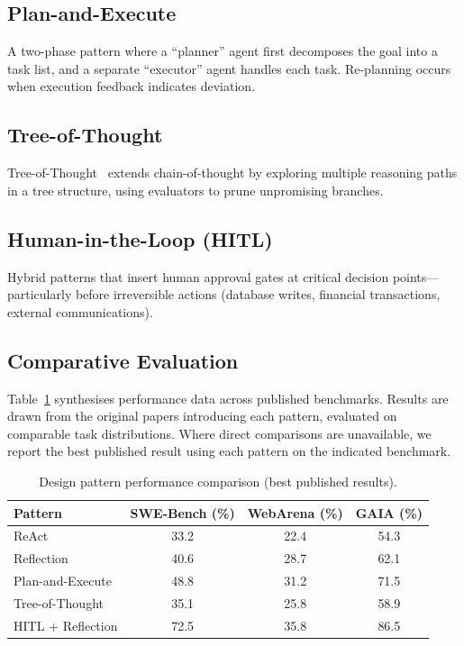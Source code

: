 \documentclass[12pt, a4paper]{article}
\begin{document}
\subsection{Plan-and-Execute}
A two-phase pattern where a ``planner'' agent first decomposes the goal into a task list, and a separate ``executor'' agent handles each task. Re-planning occurs when execution feedback indicates deviation.

\subsection{Tree-of-Thought}
Tree-of-Thought~\citep{yao2024tree} extends chain-of-thought by exploring multiple reasoning paths in a tree structure, using evaluators to prune unpromising branches.

\subsection{Human-in-the-Loop (HITL)}
Hybrid patterns that insert human approval gates at critical decision points---particularly before irreversible actions (database writes, financial transactions, external communications).

\subsection{Comparative Evaluation}
Table~\ref{tab:patterns} synthesises performance data across published benchmarks. Results are drawn from the original papers introducing each pattern, evaluated on comparable task distributions. Where direct comparisons are unavailable, we report the best published result using each pattern on the indicated benchmark.

\begin{table}[ht]
\centering
\caption{Design pattern performance comparison (best published results).}
\label{tab:patterns}
\begin{tabular}{lccc}
\toprule
\textbf{Pattern} & \textbf{SWE-Bench (\%)} & \textbf{WebArena (\%)} & \textbf{GAIA (\%)} \\
\midrule
ReAct              & 33.2  & 22.4  & 54.3 \\
Reflection         & 40.6  & 28.7  & 62.1 \\
Plan-and-Execute   & 48.8  & 31.2  & 71.5 \\
Tree-of-Thought    & 35.1  & 25.8  & 58.9 \\
HITL + Reflection  & 72.5  & 35.8  & 86.5 \\
\bottomrule
\end{tabular}
\end{table}
\end{document}

